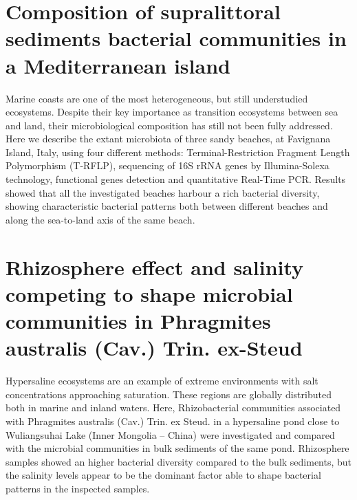 \section{Composition of supralittoral sediments bacterial communities in a Mediterranean island}
Marine coasts are one of the most heterogeneous, but still understudied ecosystems. Despite their key importance as transition ecosystems between sea and land, their microbiological composition has still not been fully addressed. Here we describe the extant microbiota of three sandy beaches, at Favignana Island, Italy, using four different methods: Terminal-Restriction Fragment Length Polymorphism (T-RFLP), sequencing of 16S rRNA genes by Illumina-Solexa technology, functional genes detection and quantitative Real-Time PCR. Results showed that all the investigated beaches harbour a rich bacterial diversity, showing characteristic bacterial patterns both between different beaches and along the sea-to-land axis of the same beach.\\

\newpage

\newpage

\section{Rhizosphere effect and salinity competing to shape microbial communities in Phragmites australis (Cav.) Trin. ex-Steud}
Hypersaline ecosystems are an example of extreme environments with salt concentrations approaching saturation. These regions are globally distributed both in marine and inland waters. Here, Rhizobacterial communities associated with Phragmites australis (Cav.) Trin. ex Steud. in a hypersaline pond close to Wuliangsuhai Lake (Inner Mongolia – China) were investigated and compared with the microbial communities in bulk sediments of the same pond. Rhizosphere samples showed an higher bacterial diversity compared to the bulk sediments, but the salinity levels appear to be the dominant factor able to shape bacterial patterns in the inspected samples.\\

\newpage

\newpage

